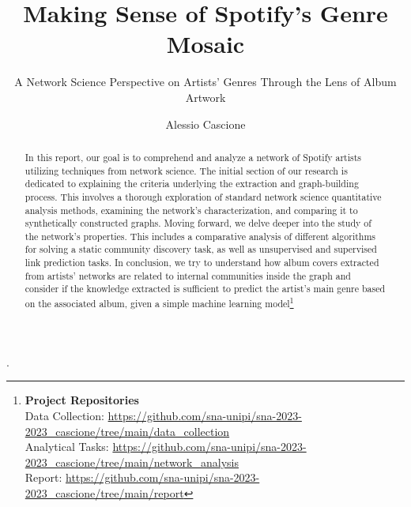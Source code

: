 \documentclass[sigchi]{acmart}
\begin{document}

\title{Making Sense of Spotify's Genre Mosaic}
\subtitle{A Network Science Perspective on Artists' Genres Through the Lens of Album Artwork}

%
\author{Alessio Cascione}

\renewcommand{\shortauthors}{Alessio Cascione}



\begin{abstract}
In this report, our goal is to comprehend and analyze a network of Spotify artists utilizing techniques from network science. The initial section of our research is dedicated to explaining the criteria underlying the extraction and graph-building process. This involves a thorough exploration of standard network science quantitative analysis methods, examining the network's characterization, and comparing it to synthetically constructed graphs. Moving forward, we delve deeper into the study of the network's properties. This includes a comparative analysis of different algorithms for solving a static community discovery task, as well as unsupervised and supervised link prediction tasks. In conclusion, we try to understand how album covers extracted from artists' networks are related to internal communities inside the graph and consider if the knowledge extracted is sufficient to predict the artist's main genre based on the associated album, given a simple machine learning model\footnote{
{\bf Project Repositories}\\
\noindent Data Collection: \url{https://github.com/sna-unipi/sna-2023-2023_cascione/tree/main/data_collection}\\
\noindent Analytical Tasks: \url{https://github.com/sna-unipi/sna-2023-2023_cascione/tree/main/network_analysis}\\
\noindent Report: \url{https://github.com/sna-unipi/sna-2023-2023_cascione/tree/main/report}}
\end{abstract}.
\end{document}
